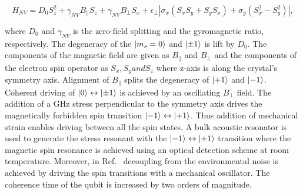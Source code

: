 \begin{equation}
\label{eq:HamiltonianNV}
H_{NV} = D_{0}S^{2}_{z}+\gamma_{NV}B_{\parallel}S_{z}+\gamma_{NV}B_{\perp}S_{x}+\epsilon_{\perp} \left | \sigma_{x}(S_{x}S_{y}+S_{y}S_{x})+\sigma_{y}(S^{2}_{x}-S^{2}_{y}) \right |, 
\end{equation} 

where $D_{0}$ and $\gamma_{NV}$ is the zero-field splitting and the gyromagnetic ratio, respectively. The degeneracy of the $\lvert m_{s}=0\rangle$ and $\lvert\pm 1\rangle$ is lift by $D_{0}$. The components of the magnetic field are given as $B_{\parallel}$ and $B_{\perp}$ and the components of the electron spin operator as $S_{x},S_{y} and S_{z}$ where z-axis is along the crystal's symmetry axis. Alignment of $B_{\parallel}$ splits the degeneracy of $\lvert+1\rangle$ and $\lvert-1\rangle$. Coherent driving of $\lvert0\rangle \leftrightarrow \lvert\pm 1\rangle$ is achieved by an oscillating $B_{\perp}$ field. The addition of a GHz stress perpendicular to the symmetry axis drives the magnetically forbidden spin transition $\lvert-1\rangle \leftrightarrow \lvert+1\rangle$. Thus addition of mechanical strain enables driving between all the spin states. A bulk acoustic resonator is used to generate the stress resonant with the $\lvert-1\rangle \leftrightarrow \lvert+1\rangle$ transition where the magnetic spin resonance is achieved using an optical detection scheme at room temperature. Moreover, in Ref.~\citep{2040-8986-19-4-044003} decoupling from the environmental noise is achieved by driving the spin transitions with a mechanical oscillator. The coherence time of the qubit is increased by two orders of magnitude.  
    

